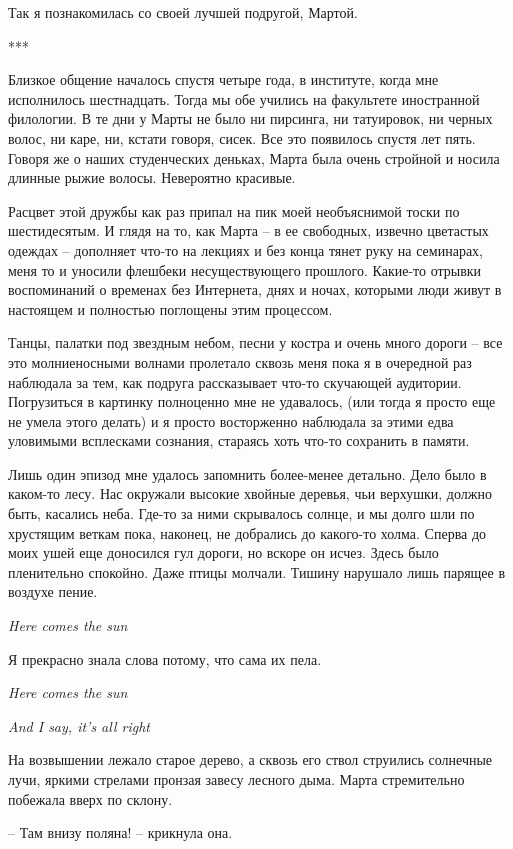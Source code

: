 \documentclass[
]{book}
\begin{document}
Так я познакомилась со своей лучшей подругой, Мартой.

***

Близкое общение началось спустя четыре года, в институте, когда мне исполнилось шестнадцать. Тогда мы обе учились на факультете иностранной филологии. В те дни у Марты не было ни пирсинга, ни татуировок, ни черных волос, ни каре, ни, кстати говоря, сисек. Все это появилось спустя лет пять. Говоря же о наших студенческих деньках, Марта была очень стройной и носила длинные рыжие волосы. Невероятно красивые.

Расцвет этой дружбы как раз припал на пик моей необъяснимой тоски по шестидесятым. И глядя на то, как Марта -- в ее свободных, извечно цветастых одеждах -- дополняет что-то на лекциях и без конца тянет руку на семинарах, меня то и уносили флешбеки несуществующего прошлого. Какие-то отрывки воспоминаний о временах без Интернета, днях и ночах, которыми люди живут в настоящем и полностью поглощены этим процессом.

Танцы, палатки под звездным небом, песни у костра и очень много дороги -- все это молниеносными волнами пролетало сквозь меня пока я в очередной раз наблюдала за тем, как подруга рассказывает что-то скучающей аудитории. Погрузиться в картинку полноценно мне не удавалось, (или тогда я просто еще не умела этого делать) и я просто восторженно наблюдала за этими едва уловимыми всплесками сознания, стараясь хоть что-то сохранить в памяти.

Лишь один эпизод мне удалось запомнить более-менее детально. Дело было в каком-то лесу. Нас окружали высокие хвойные деревья, чьи верхушки, должно быть, касались неба. Где-то за ними скрывалось солнце, и мы долго шли по хрустящим веткам пока, наконец, не добрались до какого-то холма. Сперва до моих ушей еще доносился гул дороги, но вскоре он исчез. Здесь было пленительно спокойно. Даже птицы молчали. Тишину нарушало лишь парящее в воздухе пение.

\emph{Here comes the sun}

Я прекрасно знала слова потому, что сама их пела.

\emph{Here comes the sun}

\emph{And I say, it's all right}

На возвышении лежало старое дерево, а сквозь его ствол струились солнечные лучи, яркими стрелами пронзая завесу лесного дыма. Марта стремительно побежала вверх по склону.

-- Там внизу поляна! -- крикнула она.
\end{document}
